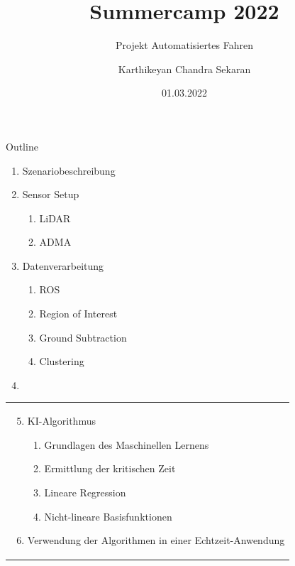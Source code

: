 \documentclass[169, handout	]{THIbeamer} %
\title{Summercamp 2022}
\subtitle{Projekt Automatisiertes Fahren}
\date{01.03.2022}
\author{Karthikeyan Chandra Sekaran}
\begin{document}
	\begin{frame}[plain]
		\maketitle
	\end{frame}
	\begin{frame}{Outline}
		\begin{minipage}{0.4\textwidth}
			\begin{enumerate}
				\item Szenariobeschreibung
				\item Sensor Setup
				\begin{enumerate}
					\item LiDAR
					\item ADMA
				\end{enumerate}
				\item Datenverarbeitung
				\begin{enumerate}
					\item ROS
					\item Region of Interest
					\item Ground Subtraction
					\item Clustering		
				\end{enumerate}
			\item[]
			\end{enumerate}
		\end{minipage}%
		\hfill
		\begin{minipage}{0.5\textwidth}
		\begin{tabular}{p{\textwidth}}
			\begin{enumerate}
				\setcounter{enumi}{4}	
				\item KI-Algorithmus 				
				\begin{enumerate}
					\item Grundlagen des Maschinellen Lernens
					\item Ermittlung der kritischen Zeit	
					\item Lineare Regression 
					\item Nicht-lineare Basisfunktionen 
				\end{enumerate}	
				\item Verwendung der Algorithmen in einer Echtzeit-Anwendung
			\end{enumerate}
		\end{tabular}
		\end{minipage}%
	\end{frame}
\end{document}
